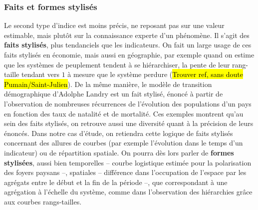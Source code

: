 \documentclass[12pt, a4paper, oneside]{book}
\begin{document}
	\subsubsection{Faits et formes stylisés}
	Le second type d'indice est moins précis, ne reposant pas sur une valeur estimable, mais plutôt sur la connaissance experte d'un phénomène. Il s'agit des \og \textbf{faits stylisés}\fg{}\footnotemark{}, plus tendanciels que les indicateurs. On fait un large usage de ces faits stylisés en économie, mais aussi en géographie, par exemple quand on estime que les systèmes de peuplement tendent à se hiérarchiser, la pente de leur rang-taille tendant vers $1$ à mesure que le système perdure (\hl{Trouver ref, sans doute Pumain/Saint-Julien}). De la même manière, le modèle de transition démographique d'Adolphe Landry est un fait stylisé, énoncé à partir de l'observation de nombreuses récurrences de l'évolution des populations d'un pays en fonction des taux de natalité et de mortalité. Ces exemples montrent qu'au sein des faits stylisés, on retrouve aussi une diversité quant à la précision de leurs énoncés. Dans notre cas d'étude, on retiendra cette logique de faits stylisés concernant des allures de courbes (par exemple l'évolution dans le temps d'un indicateur) ou de répartition spatiale. On pourra dès lors parler de \og \textbf{formes stylisées}\fg{}, aussi bien temporelles -- courbe logistique estimée pour la polarisation des foyers paysans --, spatiales -- différence dans l'occupation de l'espace par les agrégats entre le début et la fin de la période --, que correspondant à une agrégation à l'échelle du système, comme dans l'observation des hiérarchies grâce aux courbes rangs-tailles.
	
\end{document}
